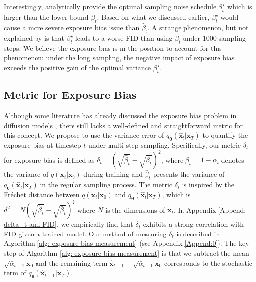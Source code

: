\documentclass{article} \usepackage{iclr2024_conference,times}
\begin{document}
Interestingly, \citet{bao2022analytic} analytically provide the optimal sampling noise schedule $\beta^{\star}_t$ which is larger than the lower bound $\tilde{\beta_t}$. Based on what we discussed earlier, $\beta^{\star}_t$ would cause a more severe exposure bias issue than $\tilde{\beta_t}$. A strange phenomenon, but not explained by \citet{bao2022analytic} is that $\beta^{\star}_t$ leads to a worse FID than using $\tilde{\beta_t}$ under $1000$ sampling steps. We believe the exposure bias is in the position to account for this phenomenon: under the long sampling, the negative impact of exposure bias exceeds the positive gain of the optimal variance $\beta^{\star}_t$.



\subsection{Metric for Exposure Bias}
Although some literature has already discussed the exposure bias problem in diffusion models \citep{ning2023input, li2023alleviating}, there still lacks a well-defined and straightforward metric for this concept. We propose to use the variance error of $q_{\pmb{\theta}}(\hat{\pmb{x}}_{t} | \pmb{x}_{T})$ to quantify the exposure bias at timestep $t$ under multi-step sampling. Specifically, our metric $\delta_t$ for exposure bias is defined as $\delta_t = (\sqrt{\hat{\beta}_t} - \sqrt{\bar{\beta}_t})^2 $, where $\bar{\beta}_t = 1-\bar{\alpha}_t$ denotes the variance of $q(\pmb{x}_{t} | \pmb{x}_0)$ during training and $\hat{\beta}_t$ presents the variance of $q_{\pmb{\theta}}(\hat{\pmb{x}}_{t} | \pmb{x}_{T})$ in the regular sampling process. The metric $\delta_t$ is inspired by the Fréchet distance \citep{dowson1982frechet} between $q(\pmb{x}_{t} | \pmb{x}_0)$ and $q_{\pmb{\theta}}(\hat{\pmb{x}}_{t} | \pmb{x}_{T})$, which is $d^2 = N(\sqrt{\hat{\beta}_t} - \sqrt{\bar{\beta}_t})^2$ where $N$ is the dimensions of $\pmb{x}_{t}$. In Appendix \ref{Append: delta_t and FID}, we empirically find that $\delta_t$ exhibits a strong correlation with FID given a trained model. Our method of measuring $\delta_t$ is described in Algorithm \ref{alg: exposure bias measurement} (see Appendix \ref{Append:0}). The key step of Algorithm \ref{alg: exposure bias measurement} is that we subtract the mean $\sqrt{\bar{\alpha}_{t-1}} \pmb{x}_0$ and the remaining term $\hat{\pmb{x}}_{t-1} - \sqrt{\bar{\alpha}_{t-1}} \pmb{x}_0$ corresponds to the stochastic term of $q_{\pmb{\theta}}(\hat{\pmb{x}}_{t-1} | \pmb{x}_{T})$.
\end{document}
